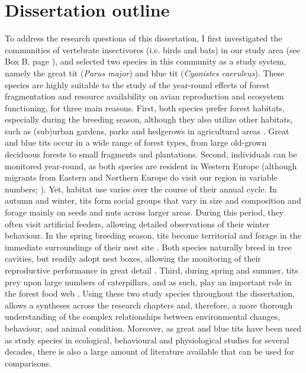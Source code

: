 \documentclass[10pt, twoside]{book} %
\begin{document}
\clearpage	
	\section{Dissertation outline}
To address the research questions of this dissertation, I first investigated the communities of vertebrate insectivores (i.e. birds and bats) in our study area (see Box B, page \pageref{boxb}), and selected two species in this community as a study system, namely the great tit (\textit{Parus major}) and blue tit (\textit{Cyanistes caeruleus}). These species are highly suitable to the study of the year-round effects of forest fragmentation and resource availability on avian reproduction and ecosystem functioning, for three main reasons. First, both species prefer forest habitats, especially during the breeding season, although they also utilize other habitats, such as (sub)urban gardens, parks and hedgerows in agricultural areas \citep{Gosler1993, Stenning2018}. Great and blue tits occur in a wide range of forest types, from large old-grown deciduous forests to small fragments and plantations. Second, individuals can be monitored year-round, as both species are resident in Western Europe (although migrants from Eastern and Northern Europe do visit our region in variable numbers; \citealt{Harrap1996}). Yet, habitat use varies over the course of their annual cycle. In autumn and winter, tits form social groups that vary in size and composition and forage mainly on seeds and nuts across larger areas. During this period, they often visit artificial feeders, allowing detailed observations of their winter behaviour. In the spring breeding season, tits become territorial and forage in the immediate surroundings of their nest site \citep{Naef-Daenzer2000}. Both species naturally breed in tree cavities, but readily adopt nest boxes, allowing the monitoring of their reproductive performance in great detail \citep{Lambrechts2010}. Third, during spring and summer, tits prey upon large numbers of caterpillars, and as such, play an important role in the forest food web \citep{Sanz2001, Mols2007}. Using these two study species throughout the dissertation, allows a syntheses across the research chapters and, therefore, a more thorough understanding of the complex relationships between environmental changes, behaviour, and animal condition. Moreover, as great and blue tits have been used as study species in ecological, behavioural and physiological studies for several decades, there is also a large amount of literature available that can be used for comparisons.\\
\end{document}
